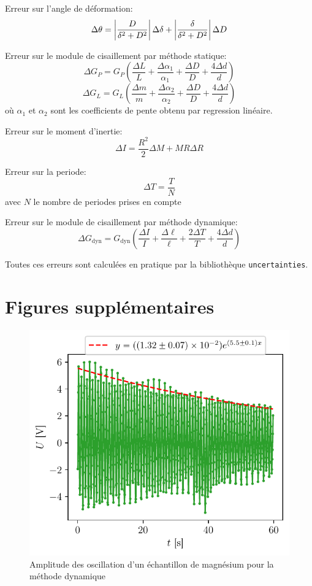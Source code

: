 Erreur sur l'angle de déformation:
\begin{equation}
    \Delta \theta = \left|\frac{D}{\delta^2 + D^2}\right| \Delta \delta + \left|\frac{\delta}{\delta^2 + D^2}\right| \Delta D
\end{equation}

Erreur sur le module de cisaillement par méthode statique:
\begin{equation}
    \Delta G_P = G_P \left(\frac{\Delta L}{L} + \frac{\Delta \alpha_1}{\alpha_1} + \frac{\Delta D}{D} + \frac{4\Delta d}{d}\right)
\end{equation}
\begin{equation}
    \Delta G_L = G_L \left(\frac{\Delta m}{m} + \frac{\Delta \alpha_2}{\alpha_2} + \frac{\Delta D}{D} + \frac{4 \Delta d}{d}\right)
\end{equation}
où $\alpha_1$ et $\alpha_2$ sont les coefficients de pente obtenu par regression linéaire.

Erreur sur le moment d'inertie:
\begin{equation}
    \Delta I = \frac{R^2}{2}\Delta M + M R \Delta R
\end{equation}

Erreur sur la periode:
\begin{equation}
    \Delta T = \frac{T}{N}
\end{equation}
avec $N$ le nombre de periodes prises en compte

Erreur sur le module de cisaillement par méthode dynamique:
\begin{equation}
    \Delta G_\textrm{dyn} = G_\textrm{dyn} \left(\frac{\Delta I}{I} + \frac{\Delta \ell}{\ell} + \frac{2 \Delta T}{T} + \frac{4 \Delta d}{d}\right)
\end{equation}

Toutes ces erreurs sont calculées en pratique par la bibliothèque \texttt{uncertainties}.

\section{Figures supplémentaires}
\label{sec:figsup}

\begin{figure}[h]
    \centering
    \includegraphics[width=0.6\linewidth]{figures/magnesium1.pdf}
    \caption{Amplitude des oscillation d'un échantillon de magnésium pour la méthode dynamique}
    \label{fig:dynamique_magnesium_feur}
\end{figure}
